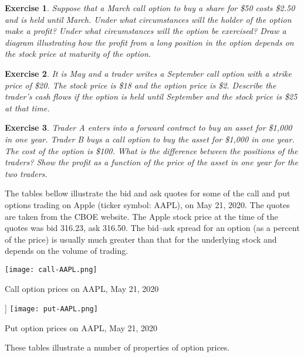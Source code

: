 \documentclass[letterpaper,10pt]{article}
\newtheorem{ex}{Exercise}
\begin{document}
\begin{ex}
Suppose that a March call option to buy a share for \$50 costs \$2.50 and is held until March. Under what circumstances will the holder of the option make a profit? Under what circumstances will the option be exercised? Draw a diagram illustrating how the profit from a long position in the option depends on the stock price at maturity of the option.
\end{ex}

\begin{ex}
It is May and a trader writes a September call option with a strike price of \$20. The stock price is \$18 and the option price is \$2. Describe the trader’s cash flows if the option is held until September and the stock price is \$25 at that time.
\end{ex}

\begin{ex}
Trader A enters into a forward contract to buy an asset for \$1,000 in one year. Trader B buys a call option to buy the asset for \$1,000 in one year. The cost of the option is \$100. What is the difference between the positions of the traders? Show the profit as a function of the price of the asset in one year for the two traders.
\end{ex}


The tables bellow illustrate the bid and ask quotes for some of the call and put options trading on Apple (ticker symbol: AAPL), on May 21, 2020. The quotes are taken from the CBOE website. The Apple stock price at the time of the quotes was bid 316.23, ask 316.50. The bid–ask spread for an option (as a percent of the price) is usually much greater than that for the underlying stock and depends on the volume of trading.

\begin{center}
\begin{table}[H]
\texttt{[image: call-AAPL.png]}
\caption{Call option prices on AAPL, May 21, 2020}
\label{call-AAPL}
\end{table}
\end{center}

\begin{center}
\begin{table}[H]]
\texttt{[image: put-AAPL.png]}
\caption{Put option prices on AAPL, May 21, 2020}
\label{put-AAPL}
\end{table}
\end{center}

These tables illustrate a number of properties of option prices.
\end{document}
